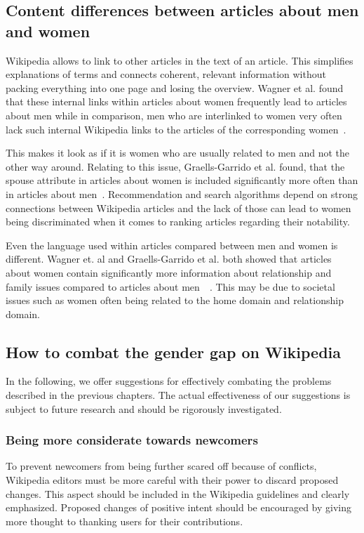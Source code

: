 \documentclass[a4paper, 11pt]{article}
\begin{document}
\subsection{Content differences between articles about men and women} \label{sec:gender-gap-wikipedia:contentdiff}
Wikipedia allows to link to other articles in the text of an article. This simplifies explanations of terms and connects coherent, relevant information without packing everything into one page and losing the overview. Wagner et al. found that these internal links within articles about women frequently lead to articles about men while in comparison, men who are interlinked to women very often lack such internal Wikipedia links to the articles of the corresponding women~\cite{wagner2015s}.

This makes it look as if it is women who are usually related to men and not the other way around. Relating to this issue, Graells-Garrido et al. found, that the spouse attribute in articles about women is included significantly more often than in articles about men~\cite{graells2015first}. Recommendation and search algorithms depend on strong connections between Wikipedia articles and the lack of those can lead to women being discriminated when it comes to ranking articles regarding their notability.

Even the language used within articles compared between men and women is different. Wagner et. al and Graells-Garrido et al. both showed that articles about women contain significantly more information about relationship and family issues compared to articles about men~\cite{wagner2015s}~\cite{graells2015first}. This may be due to societal issues such as women often being related to the home domain and relationship domain.

\subsection{How to combat the gender gap on Wikipedia} \label{sec:gender-gap-wikipedia:combatgap}
In the following, we offer suggestions for effectively combating the problems described in the previous chapters. The actual effectiveness of our suggestions is subject to future research and should be rigorously investigated.

\subsubsection{Being more considerate towards newcomers} \label{sec:gender-gap-wikipedia:newcomers}
To prevent newcomers from being further scared off because of conflicts, Wikipedia editors must be more careful with their power to discard proposed changes. This aspect should be included in the Wikipedia guidelines and clearly emphasized. Proposed changes of positive intent should be encouraged by giving more thought to thanking users for their contributions.
\end{document}
